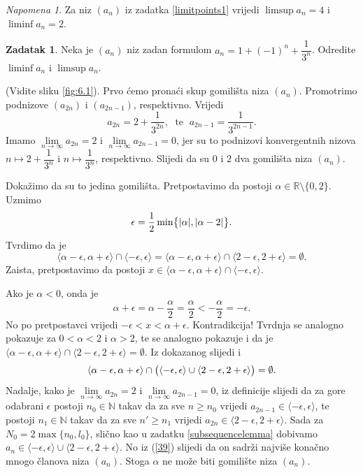 \documentclass{book}
\let\originalleft\left
\let\originalright\right
\renewcommand{\left}{\mathopen{}\mathclose\bgroup\originalleft}
\renewcommand{\right}{\aftergroup\egroup\originalright}
\renewenvironment{proof}{%
    \vspace{-\parskip}\begin{oldproof}%
    }{%
    \end{oldproof}%
}
\theoremstyle{definition}
\theoremstyle{definition}
\newtheorem{exercise}{Zadatak}
\theoremstyle{remark}
\newtheorem{remark}{Napomena}
\begin{document}
\begin{remark}
Za niz $(a_n)$ iz zadatka \ref{limitpoints1} vrijedi $\limsup{a_n}=4$ i $\liminf{a_n}=2$.
\end{remark}

\begin{exercise}
\label{limitpoints2}
Neka je $(a_n)$ niz zadan formulom $a_n=1+(-1)^n+\dfrac{1}{3^n}$. Odredite $\liminf{a_n}$ i $\limsup{a_n}$.
\end{exercise}
\begin{proof}[Rješenje]
(Vidite sliku \ref{fig:6.1}). Prvo ćemo pronaći skup gomilišta niza $(a_n)$. Promotrimo podnizove $(a_{2n})$ i $(a_{2n-1})$, respektivno. Vrijedi $$a_{2n}=2+\dfrac{1}{3^{2n}},\;\text{ te }\;a_{2n-1}=\dfrac{1}{3^{2n-1}}.$$ 
Imamo $\lim\limits_{n\to \infty}{a_{2n}}=2$ i $\lim\limits_{n\to \infty}{a_{2n-1}}=0$, jer su to podnizovi konvergentnih nizova $n\mapsto 2+\dfrac{1}{3^n}$ i $n\mapsto \dfrac{1}{3^n}$, respektivno. Slijedi da su $0$ i $2$ dva gomilišta niza $(a_n)$. 

Dokažimo da su to jedina gomilišta. Pretpostavimo da postoji $\alpha\in \mathbb{R}\setminus\{0, 2\}$. Uzmimo $$\epsilon=\dfrac{1}{2}\min\left\{|\alpha|, |\alpha-2|\right\}.$$ 
Tvrdimo da je $$\langle \alpha-\epsilon,\alpha+\epsilon\rangle\cap\langle -\epsilon,\epsilon\rangle=\langle \alpha-\epsilon,\alpha+\epsilon\rangle\cap\langle 2-\epsilon,2+\epsilon\rangle=\emptyset.$$ 
Zaista, pretpostavimo da postoji $x\in \langle\alpha-\epsilon,\alpha+\epsilon\rangle\cap\langle -\epsilon,\epsilon\rangle$.

Ako je $\alpha<0$, onda je
$$\alpha+\epsilon=\alpha-\dfrac{\alpha}{2}=\dfrac{\alpha}{2}<-\dfrac{\alpha}{2}=-\epsilon.$$
No po pretpostavci vrijedi $-\epsilon<x<\alpha+\epsilon$. Kontradikcija! Tvrdnja se analogno pokazuje za $0<\alpha<2$ i $\alpha>2$, te se analogno pokazuje i da je $\langle \alpha-\epsilon,\alpha+\epsilon\rangle\cap\langle 2-\epsilon,2+\epsilon\rangle=\emptyset$.
Iz dokazanog slijedi i 
\begin{gather}
\label{39}
\langle \alpha-\epsilon,\alpha+\epsilon\rangle\cap\left(\langle -\epsilon,\epsilon\rangle \cup\langle 2-\epsilon,2+\epsilon\rangle\right)=\emptyset.
\end{gather}
Nadalje, kako je $\lim\limits_{n\to \infty}{a_{2n}}=2$ i $\lim\limits_{n\to \infty}{a_{2n-1}}=0$, iz definicije slijedi da za gore odabrani $\epsilon$ postoji $n_0\in \mathbb{N}$ takav da za sve $n\geq n_0$ vrijedi $a_{2n-1}\in \langle-\epsilon, \epsilon\rangle$, te postoji $n_1\in \mathbb{N}$ takav da za sve $n'\geq n_1$ vrijedi $a_{2n}\in \langle 2-\epsilon, 2+\epsilon\rangle$. Sada za $N_0=2\max\{n_0, l_0\}$, slično kao u zadatku \ref{subsequencelemma} dobivamo $a_n\in \langle-\epsilon, \epsilon\rangle \cup \langle 2-\epsilon, 2+\epsilon\rangle$. No iz (\ref{39}) slijedi da on sadrži najviše konačno mnogo članova niza $(a_n)$. Stoga $\alpha$ ne može biti gomilište niza $(a_n)$.


\end{proof}
\end{document}
